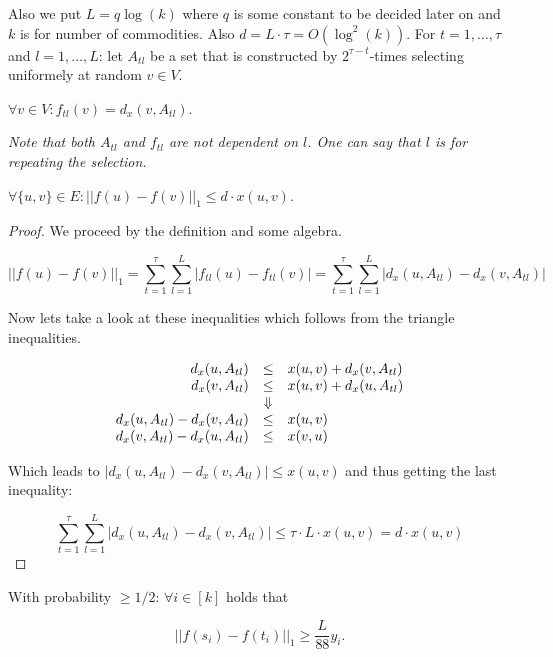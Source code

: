 Also we put $L = q \log (k)$ where $q$ is some constant to be decided later on and $k$ is for number of commodities. Also $d = L \cdot \tau = O (\log^{2}(k))$. For $t = 1, \dots, \tau$ and $l = 1, \dots, L$: let $A_{tl}$ be a set that is constructed by $2^{\tau - t}$-times selecting uniformely at random $v \in V$.

\begin{defn}
	$\forall v \in V: f_{tl}(v) = d_{x}(v, A_{tl})$.
\end{defn}

\textit{Note that both $A_{tl}$ and $f_{tl}$ are not dependent on $l$. One can say that $l$ is for repeating the selection.}

\begin{lemma}
	$\forall \{u,v\} \in E : || f(u) - f(v)||_{1} \leq d \cdot x(u,v)$.
\end{lemma}

\begin{proof}
	We proceed by the definition and some algebra.
	
	$$
	|| f(u) - f(v)||_{1} = \sum_{t = 1}^{\tau} \sum_{l = 1}^{L} |f_{tl}(u) - f_{tl}(v)| = \sum_{t = 1}^{\tau} \sum_{l = 1}^{L} |d_{x}(u, A_{tl}) - d_{x}(v, A_{tl})|
	$$
	
	Now lets take a look at these inequalities which follows from the triangle inequalities.
	
	$$
	\begin{array}{r c l}
		d_{x}(u, A_{tl}) & \leq & x(u,v) + d_{x}(v, A_{tl}) \\
		d_{x}(v, A_{tl}) & \leq & x(u,v) + d_{x}(u, A_{tl}) \\
		& \Downarrow & \\
		d_{x}(u, A_{tl}) - d_{x}(v,A_{tl}) & \leq & x(u,v) \\
		d_{x}(v, A_{tl}) - d_{x}(u,A_{tl}) & \leq & x(v,u)
	\end{array}
	$$
	
	Which leads to $|d_{x}(u,A_{tl}) - d_{x}(v, A_{tl})| \leq x(u,v)$ and thus getting the last inequality:
	
	$$
	\sum_{t = 1}^{\tau} \sum_{l = 1}^{L} |d_{x}(u, A_{tl}) - d_{x}(v, A_{tl})| \leq \tau \cdot L \cdot x(u,v) = d \cdot x(u,v)
	$$
\end{proof}

\begin{lemma}
	With probability $\geq 1/2$: $\forall i \in [k]$ holds that
	
	$$
	||f(s_{i}) - f(t_{i})||_{1} \geq \frac{L}{88} y_{i}.
	$$
\end{lemma}

